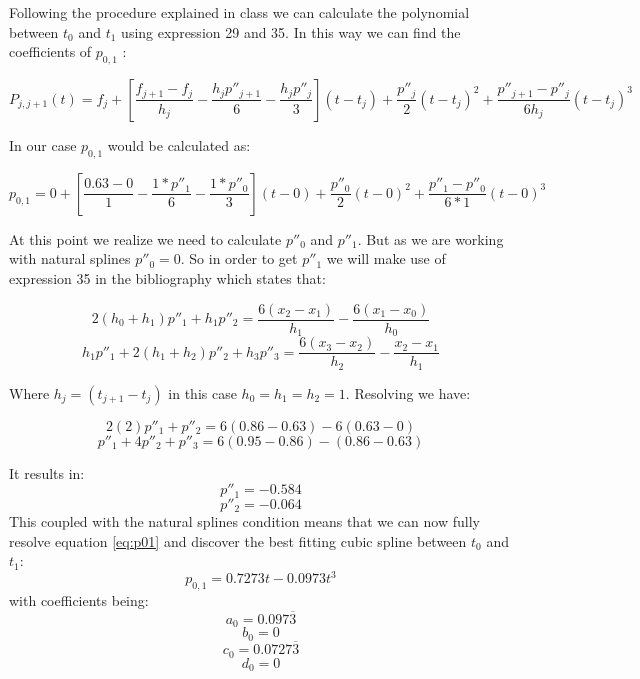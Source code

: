 \documentclass[]{article}
\begin{document}
Following the procedure explained in class we can calculate the polynomial between $t_0$ and $t_1$ using expression 29 and 35.
In this way we can find the coefficients of $p_{0,1}$ :

\begin{equation}
    P_{j,j+1}(t)=f_j + \left[ \frac{f_{j+1}-f_j}{h_j}-\frac{h_jp''_{j+1}}{6}-\frac{h_jp''_j}{3} \right] (t-t_j)+\frac{p''_j}{2}(t-t_j)^2+\frac{p''_{j+1}-p''_j}{6h_j}(t-t_j)^3
\end{equation}

In our case $p_{0,1}$ would be calculated as:

\begin{equation}\label{eq:p01}
    p_{0,1}=0+ \left[ \frac{0.63-0}{1}-\frac{1*p''_1}{6}-\frac{1*p''_0}{3} \right](t-0)+\frac{p''_0}{2}(t-0)^2+\frac{p''_1-p''_0}{6*1}(t-0)^3
\end{equation}

At this point we realize we need to calculate $p''_0$ and $p''_1$. But as we are working with natural splines $p''_0=0$. So in order to get $p''_1$ we will make use of expression 35 in the bibliography which states that:

\begin{equation}
    2(h_0+h_1)p''_1+h_1p''_2=\frac{6(x_2-x_1)}{h_1}-\frac{6(x_1-x_0)}{h_0}
\end{equation}
\begin{equation}
    h_1p''_1+2(h_1+h_2)p''_2+h_3p''_3=\frac{6(x_3-x_2)}{h_2}-\frac{x_2-x_1}{h_1}
\end{equation}

Where $h_j=(t_{j+1}-t_j)$ in this case $h_0=h_1=h_2=1$. Resolving we have:

\begin{equation}
    2(2)p''_1+p''_2=6(0.86-0.63)-6(0.63-0)
\end{equation}
\begin{equation}
    p''_1+4p''_2+p''_3=6(0.95-0.86)-(0.86-0.63)
\end{equation}

It results in:\[p''_1=-0.584\]\[p''_2=-0.064\]
This coupled with the natural splines condition means that we can now fully resolve equation \ref{eq:p01} and discover the best fitting cubic spline between $t_0$ and $t_1$:
\[p_{0,1}=0.7273t-0.0973t^3\] with coefficients being:
\[a_0=0.097\overline{3}\]
\[b_0=0\]
\[c_0=0.0727\overline{3}\]
\[d_0=0\]
\end{document}

